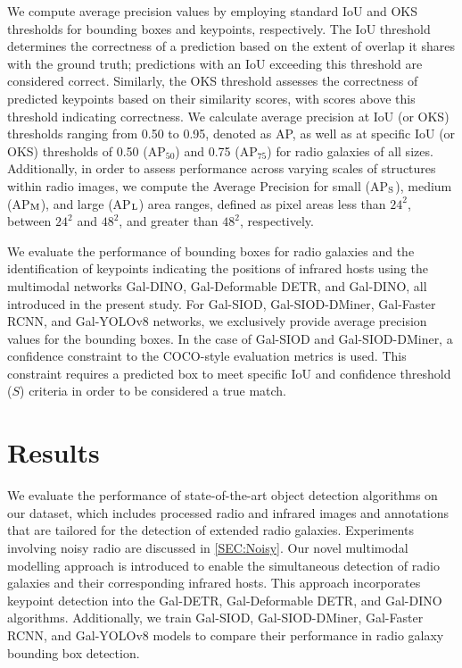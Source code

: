 \documentclass[
  journal=pasa,
  manuscript=research-paper, %
  year=2020,
  volume=37,
]{cup-journal}
\begin{document}
We compute average precision values by employing standard IoU and OKS thresholds for bounding boxes and keypoints, respectively. 
The IoU threshold determines the correctness of a prediction based on the extent of overlap it shares with the ground truth; predictions with an IoU exceeding this threshold are considered correct. 
Similarly, the OKS threshold assesses the correctness of predicted keypoints based on their similarity scores, with scores above this threshold indicating correctness.
We calculate average precision at IoU (or OKS) thresholds ranging from 0.50 to 0.95, denoted as AP, as well as at specific IoU (or OKS) thresholds of 0.50 (AP$_{50}$) and 0.75 (AP$_{75}$) for radio galaxies of all sizes. 
Additionally, in order to assess performance across varying scales of structures within radio images, we compute the Average Precision for small (AP$_{\rm S}$), medium (AP$_{\rm M}$), and large (AP$_{\rm L}$) area ranges, defined as pixel areas less than $24^2$, between $24^2$ and $48^2$, and greater than $48^2$, respectively.

We evaluate the performance of bounding boxes for radio galaxies and the identification of keypoints indicating the positions of infrared hosts using the multimodal networks Gal-DINO, Gal-Deformable DETR, and Gal-DINO, all introduced in the present study.
For Gal-SIOD, Gal-SIOD-DMiner, Gal-Faster RCNN, and Gal-YOLOv8 networks, we exclusively provide average precision values for the bounding boxes. 
In the case of Gal-SIOD and Gal-SIOD-DMiner, a confidence constraint to the COCO-style evaluation metrics is used. 
This constraint requires a predicted box to meet specific IoU and confidence threshold ($S$) criteria in order to be considered a true match.

\section{Results}
\label{SEC:Results}
We evaluate the performance of state-of-the-art object detection algorithms on our dataset, which includes processed radio and infrared images and annotations that are tailored for the detection of extended radio galaxies. 
Experiments involving noisy radio are discussed in \ref{SEC:Noisy}. 
Our novel multimodal modelling approach is introduced to enable the simultaneous detection of radio galaxies and their corresponding infrared hosts. 
This approach incorporates keypoint detection into the Gal-DETR, Gal-Deformable DETR, and Gal-DINO algorithms. Additionally, we train Gal-SIOD, Gal-SIOD-DMiner, Gal-Faster RCNN, and Gal-YOLOv8 models to compare their performance in radio galaxy bounding box detection.
\end{document}
